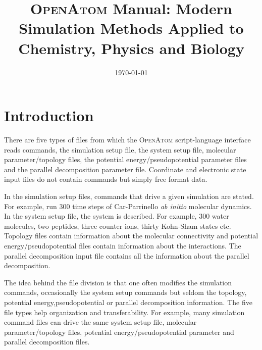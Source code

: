 \documentclass[12pt,titlepage]{article}
\title{\textsc{OpenAtom} Manual: Modern Simulation Methods Applied to Chemistry, Physics and Biology}
\date{\today}
\begin{document}
\maketitle
\tableofcontents
\newpage


\section{\bf Introduction}

There are five types of files from which the \textsc{OpenAtom}
script-language interface reads commands, the
simulation setup file, the system setup file, molecular parameter/topology
files, the potential energy/pseudopotential parameter files and the
parallel decomposition parameter file. Coordinate and electronic state input files do 
not contain commands but simply free format data. 

In the simulation setup files, commands that drive a given simulation
are stated. For example, run 300 time steps of Car-Parrinello {\em ab initio}
molecular dynamics. In the system setup file, the 
system is described. For example, 300 water molecules, two peptides,
three counter ions, thirty Kohn-Sham states etc.  Topology files
contain information about the molecular connectivity and potential
energy/pseudopotential files contain information about the
interactions. The parallel decomposition
input file contains all the information about the parallel decomposition.

The idea behind the file division is that one often modifies the
simulation commands, occasionally the system setup commands but seldom the 
topology, potential energy,pseudopotential or parallel decomposition
information. 
The five file types help organization and transferability. For
example, many simulation command files can drive the same system setup file, 
molecular parameter/topology files, potential energy/pseudopotential
parameter and parallel decomposition files.
\end{document}
